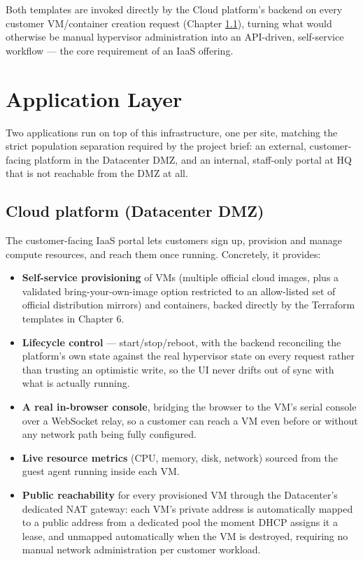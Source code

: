 \documentclass[11pt,a4paper]{report}
\begin{document}
Both templates are invoked directly by the Cloud platform's backend on
every customer VM/container creation request (Chapter \ref{ch:cloud}),
turning what would otherwise be manual hypervisor administration into an
API-driven, self-service workflow --- the core requirement of an IaaS
offering.

\chapter{Application Layer}

Two applications run on top of this infrastructure, one per site, matching
the strict population separation required by the project brief: an
external, customer-facing platform in the Datacenter DMZ, and an internal,
staff-only portal at HQ that is not reachable from the DMZ at all.

\section{Cloud platform (Datacenter DMZ)}
\label{ch:cloud}

The customer-facing IaaS portal lets customers sign up, provision and
manage compute resources, and reach them once running. Concretely, it
provides:

\begin{itemize}[leftmargin=1.5em]
  \item \textbf{Self-service provisioning} of VMs (multiple official cloud
    images, plus a validated bring-your-own-image option restricted to an
    allow-listed set of official distribution mirrors) and containers,
    backed directly by the Terraform templates in Chapter 6.
  \item \textbf{Lifecycle control} --- start/stop/reboot, with the backend
    reconciling the platform's own state against the real hypervisor state
    on every request rather than trusting an optimistic write, so the UI
    never drifts out of sync with what is actually running.
  \item \textbf{A real in-browser console}, bridging the browser to the
    VM's serial console over a WebSocket relay, so a customer can reach a
    VM even before or without any network path being fully configured.
  \item \textbf{Live resource metrics} (CPU, memory, disk, network) sourced
    from the guest agent running inside each VM.
  \item \textbf{Public reachability} for every provisioned VM through the
    Datacenter's dedicated NAT gateway: each VM's private address is
    automatically mapped to a public address from a dedicated pool the
    moment DHCP assigns it a lease, and unmapped automatically when the VM
    is destroyed, requiring no manual network administration per customer
    workload.
\end{itemize}
\end{document}
